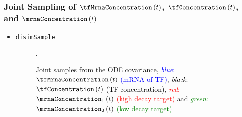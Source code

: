 \begin{frame}
  \frametitle{Joint Sampling of $\tfMrnaConcentration\left(t\right)$, $\tfConcentration\left(t\right)$, and $\mrnaConcentration\left(t\right)$ }
  \begin{itemize}
  \item {\texttt{disimSample}}%
    \begin{figure}

      \caption{ {\small Joint samples from the ODE covariance,
          \textcolor{blue}{\emph{blue}: $\tfMrnaConcentration\left(t\right)$ (mRNA of TF)},
          \textcolor{black}{\emph{black}: $\tfConcentration\left(t\right)$ (TF concentration)},
          \textcolor{red}{\emph{red}: $\mrnaConcentration_{1}\left(t\right)$ (high
            decay target)} and \textcolor{green}{\emph{green}:
            $\mrnaConcentration_{2}\left(t\right)$ (low decay target)}}}.
      
    \end{figure}
    
  \end{itemize}
  
\end{frame}

